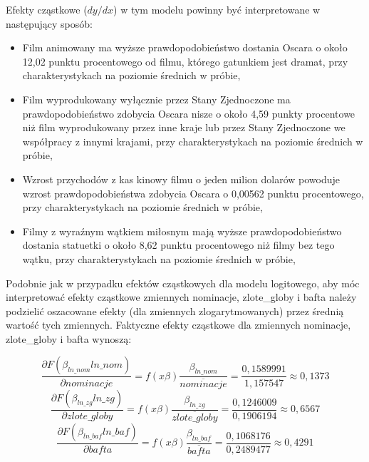 Efekty cząstkowe ($dy/dx$) w tym modelu powinny być interpretowane w następujący sposób:

\begin{itemize}
\item Film animowany ma wyższe prawdopodobieństwo dostania Oscara o około 12,02 punktu procentowego od filmu, którego gatunkiem jest dramat, przy charakterystykach na poziomie średnich w próbie,
\item Film wyprodukowany wyłącznie przez Stany Zjednoczone ma prawdopodobieństwo zdobycia Oscara nisze o około 4,59 punkty procentowe niż film wyprodukowany przez inne kraje lub przez Stany Zjednoczone we współpracy z innymi krajami, przy charakterystykach na poziomie średnich w próbie,
\item Wzrost przychodów z kas kinowy filmu o jeden milion dolarów powoduje wzrost prawdopodobieństwa zdobycia Oscara o 0,00562 punktu procentowego, przy charakterystykach na poziomie średnich w próbie,
\item Filmy z wyraźnym wątkiem miłosnym mają wyższe prawdopodobieństwo dostania statuetki o około 8,62 punktu procentowego niż filmy bez tego wątku, przy charakterystykach na poziomie średnich w próbie,
\end{itemize}

Podobnie jak w przypadku efektów cząstkowych dla modelu logitowego, aby móc interpretować efekty cząstkowe zmiennych nominacje, zlote_globy i bafta należy podzielić oszacowane efekty (dla zmiennych zlogarytmowanych) przez średnią wartość tych zmiennych. Faktyczne efekty cząstkowe dla zmiennych nominacje, zlote_globy i bafta wynoszą:

\begin{equation}
\frac{\partial F(\beta_{ln\_nom}ln\_nom)}{\partial nominacje}=f(x\beta)\frac{\beta_{ln\_nom}}{\overline{nominacje}}= \frac{0,1589991}{1,157547}\approx 0,1373
\end{equation}
\begin{equation}
\frac{\partial F(\beta_{ln\_zg}ln\_zg)}{\partial zlote\_globy}=f(x\beta)\frac{\beta_{ln\_zg}}{\overline{zlote\_globy}}= \frac{0,1246009}{0,1906194}\approx 0,6567
\end{equation}
\begin{equation}
\frac{\partial F(\beta_{ln\_baf}ln\_baf)}{\partial bafta}=f(x\beta)\frac{\beta_{ln\_baf}}{\overline{bafta}}= \frac{0,1068176}{0,2489477}\approx 0,4291 
\end{equation}
\vspace{0.3cm}

